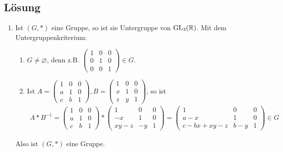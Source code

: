 \subsection{Lösung}
\begin{enumerate}
	\item Ist \( (G, *) \) eine Gruppe, so ist sie Untergruppe von \( \text{GL}_3(\mathbb{R}) \). Mit dem Untergruppenkriterium:
	\begin{enumerate}
	 	\item \( G \neq \varnothing \), denn z.B. \( \begin{pmatrix}
	 		1 & 0 & 0 \\
	 		0 & 1 & 0 \\
	 		0 & 0 & 1
	 	\end{pmatrix} \in G \).
	 	\item Ist \( A = \begin{pmatrix}
	 		1 & 0 & 0 \\
	 		a & 1 & 0 \\
	 		c & b & 1 
	 	\end{pmatrix}, B = \begin{pmatrix}
	 		1 & 0 & 0 \\
	 		x & 1 & 0 \\
	 		z & y & 1
	 	\end{pmatrix} \), so ist
	 	\begin{align*}
	 		A * B^{-1} = \begin{pmatrix}
	 			1 & 0 & 0 \\
	 			a & 1 & 0 \\
	 			c & b & 1
	 		\end{pmatrix} * \begin{pmatrix}
	 			1 & 0 & 0 \\
	 			-x & 1 & 0 \\
	 			xy-z & -y & 1
	 		\end{pmatrix} = \begin{pmatrix}
	 			1 & 0 & 0 \\
	 			a-x & 1 & 0 \\
	 			c-bx+xy-z & b-y & 1
	 		\end{pmatrix} \in G
	 	\end{align*}
	 \end{enumerate}
	 Also ist \( (G, *) \) eine Gruppe.


\end{enumerate}
